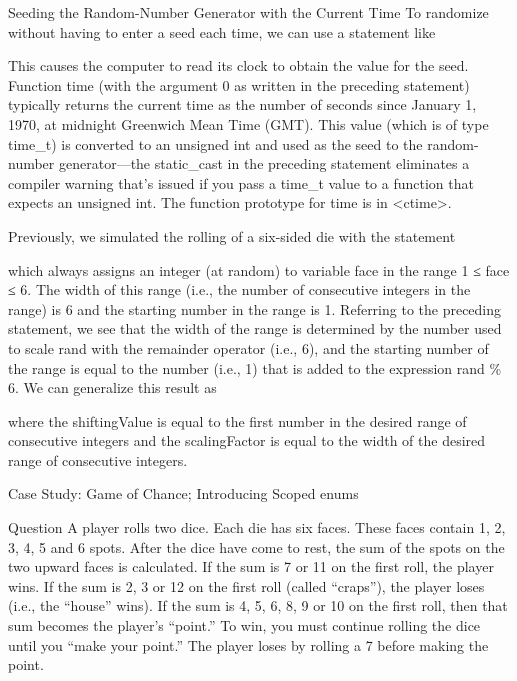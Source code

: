 \documentclass[10pt]{beamer}
\begin{document}
\begin{frame}{\small Seeding the Random-Number Generator with the Current Time}
	To randomize without having to enter a seed each time, we can use a statement like
	
	
	
	This causes the computer to read its clock to obtain the value for the seed. Function time
	(with the argument 0 as written in the preceding statement) typically returns the current
	time as the number of seconds since January 1, 1970, at midnight Greenwich Mean Time
	(GMT). This value (which is of type time\_t) is converted to an unsigned int and used as
	the seed to the random-number generator—the static\_cast in the preceding statement
	eliminates a compiler warning that’s issued if you pass a time\_t value to a function that
	expects an unsigned int. The function prototype for time is in <ctime>.
\end{frame}

\begin{frame}
	Previously, we simulated the rolling of a six-sided die with the statement
	
	
	
	which always assigns an integer (at random) to variable face in the range 1 ≤ face ≤ 6.
	The width of this range (i.e., the number of consecutive integers in the range) is 6 and the
	starting number in the range is 1. Referring to the preceding statement, we see that the
	width of the range is determined by the number used to scale rand with the remainder operator (i.e., 6), and the starting number of the range is equal to the number (i.e., 1) that is
	added to the expression rand \% 6. We can generalize this result as
	
	
	
	where the shiftingValue is equal to the first number in the desired range of consecutive integers and the scalingFactor is equal to the width of the desired range of consecutive integers.
\end{frame}

\begin{frame}{\small Case Study: Game of Chance; Introducing Scoped	enums}
	
	\begin{block}{\color{white}Question}
		A player rolls two dice. Each die has six faces. These faces contain 1, 2, 3, 4, 5 and 6
		spots. After the dice have come to rest, the sum of the spots on the two upward faces is
		calculated. If the sum is 7 or 11 on the first roll, the player wins. If the sum is 2, 3 or
		12 on the first roll (called “craps”), the player loses (i.e., the “house” wins). If the sum
		is 4, 5, 6, 8, 9 or 10 on the first roll, then that sum becomes the player’s “point.” To
		win, you must continue rolling the dice until you “make your point.” The player loses
		by rolling a 7 before making the point.
	\end{block}
\end{frame}
\end{document}
